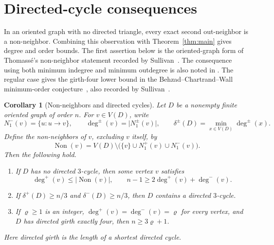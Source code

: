 \documentclass[11pt]{article}
\newtheorem{corollary}[theorem]{Corollary}
\theoremstyle{remark}
\newcommand{\abs}[1]{\lvert #1\rvert}
\DeclareMathOperator{\Non}{Non}
\begin{document}
\section{Directed-cycle consequences}\label{sec:directed-cycle-consequences}

In an oriented graph with no directed triangle, every exact second
out-neighbor is a non-neighbor. Combining this observation with
Theorem~\ref{thm:main} gives degree and order bounds.
The first assertion below is the oriented-graph form of Thomass\'e's
non-neighbor statement recorded by
Sullivan~\cite[Conjecture~6.12]{Sullivan2006}.
The consequence using both minimum indegree and minimum outdegree is also
noted in \cite[Section~3]{Sullivan2006}. The regular case gives the
girth-four lower bound in the Behzad--Chartrand--Wall minimum-order
conjecture~\cite{BehzadChartrandWall1970}, also recorded by
Sullivan~\cite[Section~4]{Sullivan2006}.

\begin{corollary}[Non-neighbors and directed cycles]\label{cor:directed-cycle-consequences}
Let \(D\) be a nonempty finite oriented graph of order \(n\). For
\(v\in V(D)\), write
\[
 N_1^-(v)=\{u:u\to v\},\qquad
 \deg^\pm(v)=\abs{N_1^\pm(v)},\qquad
 \delta^\pm(D)=\min_{x\in V(D)}\deg^\pm(x).
\]
Define the non-neighbors of \(v\), excluding \(v\) itself, by
\[
 \Non(v)=V(D)\setminus
 \bigl(\{v\}\cup N_1^+(v)\cup N_1^-(v)\bigr).
\]
Then the following hold.
\begin{enumerate}[label=\textup{(\roman*)}]
\item If \(D\) has no directed \(3\)-cycle, then some vertex \(v\) satisfies
\[
 \deg^+(v)\leq\abs{\Non(v)},\qquad
 n-1\geq 2\deg^+(v)+\deg^-(v).
\]
\item If \(\delta^+(D)\geq n/3\) and \(\delta^-(D)\geq n/3\), then \(D\)
contains a directed \(3\)-cycle.
\item If \(\varrho\geq1\) is an integer, \(\deg^+(v)=\deg^-(v)=\varrho\) for
every vertex, and \(D\) has directed girth exactly four, then
\(n\geq3\varrho+1\).
\end{enumerate}
Here directed girth is the length of a shortest directed cycle.
\end{corollary}
\end{document}

